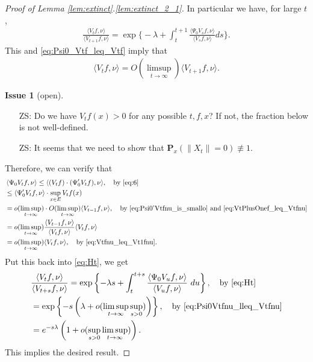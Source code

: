 \documentclass[12pt,a4paper]{amsart}
\numberwithin{equation}{section}
\theoremstyle{plain}
\theoremstyle{definition}
\newtheorem{iss}{Issue}
\begin{document}
\begin{proof}[Proof of Lemma \ref{lem:extinct}.\eqref{lem:extinct_2_1}]
In particular we have, for large $t$,
\begin{align}
\label{eq:the_magic_formula}
\frac{\langle V_tf,\nu\rangle}{\langle V_{t+1}f,\nu\rangle}
=\exp\Big\{-\lambda+\int_{t}^{t+1}\frac{\langle \Psi_0V_sf,\nu\rangle}{\langle V_sf,\nu\rangle}ds\Big\}.
\end{align}
This and \eqref{eq:Psi0_Vtf_leq_Vtf} imply that
\begin{align}
\label{eq:Vtfnu_leq_Vt1fnu}
\langle V_tf,\nu\rangle = O(\limsup_{t\to \infty}) \langle V_{t+1} f,\nu \rangle.
\end{align}
\begin{iss}[open]~
  \begin{itemize}
  \item[ZS:]
Do we have $V_tf(x)>0$ for any possible $t,f,x$? If not, the fraction below is not well-defined.
\item[ZS:]
It seems that we need to show that $\mathbf P_x (\|X_t\| = 0) \not\equiv 1 $.
  \end{itemize}
\end{iss}
Therefore, we can verify that
\begin{align}
\label{eq:Psi0vt_is_integrable}
&\left\langle \Psi_0 V_tf, \nu \right\rangle 
\leq \langle (V_tf) \cdot (\Psi'_0 V_tf), \nu \rangle,\quad\text{by~\eqref{eq:6}}
\\& \leq \langle \Psi'_0 V_tf,\nu\rangle  \cdot \sup_{x\in E} V_tf(x)
\\&= o(\limsup_{t\to \infty}) \cdot O(\limsup_{t\to \infty}) \langle V_{t-1}f,\nu\rangle,\quad\text{by~\eqref{eq:Psi0'Vtfnu_is_smallo} and \eqref{eq:VtPlusOnef_leq_Vtfnu}}
  \\&= o(\limsup_{t\to \infty}) \frac{\langle V_{t-1}f,\nu \rangle}{\langle V_{t}f ,\nu \rangle} \langle V_tf,\nu \rangle 
  \\& = o(\limsup_{t\to \infty})\langle V_tf,\nu \rangle,\quad\text{by~\eqref{eq:Vtfnu_leq_Vt1fnu}}. \label{eq:Psi0Vtfnu_lleq_Vtfnu}
\end{align}
Put this back into \eqref{eq:Ht}, we get
\begin{align}
&\frac{\langle V_tf,\nu\rangle}{\langle V_{t+s}f,\nu\rangle}
                = \exp \left\{-\lambda s+  \int_t^{t+s} \frac{\left\langle \Psi_0 V_u f,\nu \right\rangle}{ \left\langle V_uf, \nu \right\rangle } ~du \right\},\quad\text{by~\eqref{eq:Ht}}
  \\&=\exp\left\{-s\left(\lambda+o(\limsup_{t\to \infty} \sup_{s > 0})\right)\right\},\quad\text{by~\eqref{eq:Psi0Vtfnu_lleq_Vtfnu}}
\\ &= e^{-s\lambda} \left( 1+o(\sup_{s>0}\limsup_{t\to \infty}) \right). 
     \label{eq:compare_with_Vtfnu_and_VtPlussfnu}
\end{align}
This implies the desired result.
\end{proof}
\end{document}
